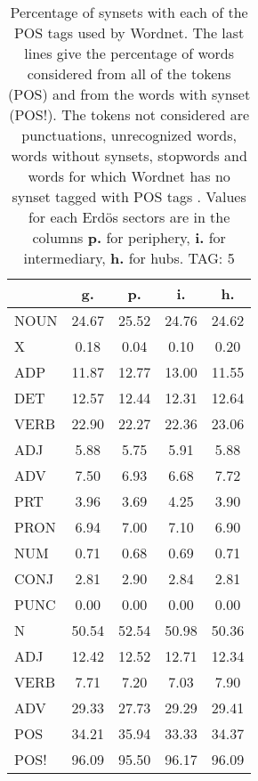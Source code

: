 \begin{table}[h!]
\begin{center}
\begin{tabular}{| l || c | c | c | c |}\hline
 & {\bf g.} & {\bf p.} & {\bf i.} & {\bf h.} \\\hline\hline
NOUN & 24.67  & 25.52  & 24.76  & 24.62 \\
X & 0.18  & 0.04  & 0.10  & 0.20 \\\hline
ADP & 11.87  & 12.77  & 13.00  & 11.55 \\
DET & 12.57  & 12.44  & 12.31  & 12.64 \\\hline
VERB & 22.90  & 22.27  & 22.36  & 23.06 \\\hline
ADJ & 5.88  & 5.75  & 5.91  & 5.88 \\
ADV & 7.50  & 6.93  & 6.68  & 7.72 \\\hline
PRT & 3.96  & 3.69  & 4.25  & 3.90 \\
PRON & 6.94  & 7.00  & 7.10  & 6.90 \\
NUM & 0.71  & 0.68  & 0.69  & 0.71 \\
CONJ & 2.81  & 2.90  & 2.84  & 2.81 \\
PUNC & 0.00  & 0.00  & 0.00  & 0.00 \\\hline\hline\hline
N & 50.54  & 52.54  & 50.98  & 50.36 \\\hline
ADJ & 12.42  & 12.52  & 12.71  & 12.34 \\\hline
VERB & 7.71  & 7.20  & 7.03  & 7.90 \\\hline
ADV & 29.33  & 27.73  & 29.29  & 29.41 \\\hline\hline
POS & 34.21  & 35.94  & 33.33  & 34.37 \\\hline
POS! & 96.09  & 95.50  & 96.17  & 96.09 \\\hline
\end{tabular}
\caption{Percentage of synsets with each of the POS tags used by Wordnet. The last lines give the percentage of words considered from all of the tokens (POS) and from the words with synset (POS!). The tokens not considered are punctuations, unrecognized words, words without synsets, stopwords and words for which Wordnet has no synset  tagged with POS tags . Values for each Erd\"os sectors are in the columns {{\bf p.}} for periphery, {{\bf i.}} for intermediary, {{\bf h.}} for hubs. TAG: 5}
\end{center}
\end{table}